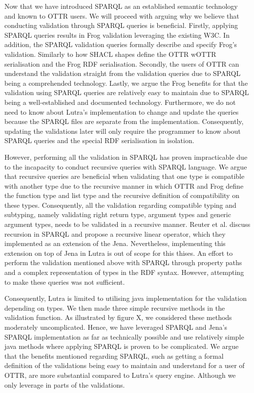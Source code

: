 \para
Now that we have introduced SPARQL as an established semantic technology and known to OTTR users. We will proceed with arguing why we believe that conducting validation through SPARQL queries is beneficial. Firstly, applying SPARQL queries results in Frog validation leveraging the existing W3C. In addition, the SPARQL validation queries formally describe and specify Frog's validation. Similarly to how SHACL shapes define the OTTR wOTTR serialisation and the Frog RDF serialisation. Secondly, the users of OTTR can understand the validation straight from the validation queries due to SPARQL being a comprehended technology. Lastly, we argue the Frog benefits for that the validation using SPARQL queries are relatively easy to maintain due to SPARQL being a well-established and documented technology. Furthermore, we do not need to know about Lutra's implementation to change and update the queries because the SPARQL files are separate from the implementation. Consequently, updating the validations later will only require the programmer to know about SPARQL queries and the special RDF serialisation in isolation.

\para
However, performing all the validation in SPARQL has proven impracticable due to the incapacity to conduct recursive queries with SPARQL language\cite[711]{RecursionSPARQL}. We argue that recursive queries are beneficial when validating that one type is compatible with another type due to the recursive manner in which OTTR and Frog define the function type and list type and the recursive definition of compatibility on these types. Consequently, all the validation regarding compatible typing and subtyping, namely validating right return type, argument types and generic argument types, needs to be validated in a recursive manner. Reuter et al. discuss recursion in SPARQL and propose a recursive linear operator, which they implemented as an extension of the Jena\cite[732]{RecursionSPARQL}. Nevertheless, implementing this extension on top of Jena in Lutra is out of scope for this thises. An effort to perform the validation mentioned above with SPARQL through property paths and a complex representation of types in the RDF syntax. However, attempting to make these queries was not sufficient. 

\para
Consequently, Lutra is limited to utilising java implementation for the validation depending on types. We then made three simple recursive methods in the validation function. As illustrated by figure X, we considered these methods moderately uncomplicated. Hence, we have leveraged SPARQL and Jena's SPARQL implementation as far as technically possible and use relatively simple java methods where applying SPARQL is proven to be complicated. We argue that the benefits mentioned regarding SPARQL, such as getting a formal definition of the validations being easy to maintain and understand for a user of OTTR, are more substantial compared to Lutra's query engine. Although we only leverage in parts of the validations. 

